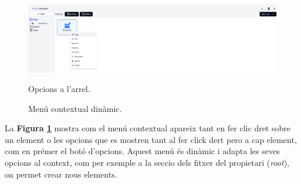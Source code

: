 \begin{figure}[H]
\begin{minipage}{0.32\textwidth}
        \centering
        \includegraphics[width=\linewidth]{Figures/ui-web/root_section_options.png}
        \caption{Opcions a l'arrel.}
    \end{minipage}
    \caption{Menú contextual dinàmic.}
    \label{fig:react-context-menu-impl}
\end{figure}

La \textbf{Figura \ref{fig:react-context-menu-impl}} mostra com el menú contextual apareix tant en fer clic dret sobre un element o les opcions que es mostren tant al fer click dert pero a cap element, com en prémer el botó d'opcions. Aquest menú és dinàmic i adapta les seves opcions al context, com per exemple a la seccio dels fitxer del propietari (\textit{root}), on permet crear nous elements.

